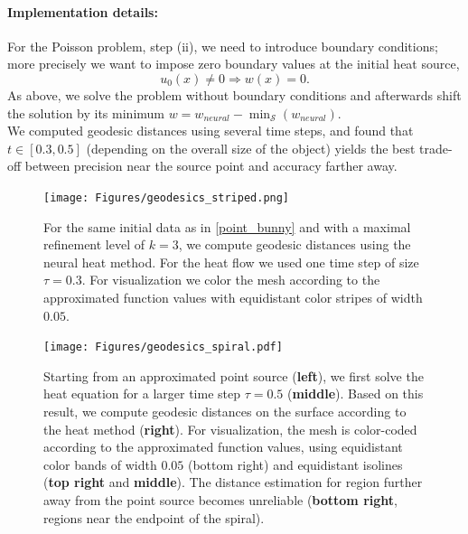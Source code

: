 \documentclass[12pt,openany]{book}
\def\S{\mathcal{S}}
\theoremstyle{plainnormal}
\theoremstyle{remark}
\begin{document}
\paragraph{Implementation details:}
For the Poisson problem, step (ii), we need to introduce boundary conditions; more precisely we want to impose zero boundary values at the initial heat source, $$u_0(x) \neq 0 \Rightarrow w(x) = 0.$$
As above, we solve the problem without boundary conditions and afterwards shift the solution by its minimum $w = w_{neural} - \min_\S(w_{neural}).$\\
We computed geodesic distances using several time steps, and found that \( t \in [0.3, 0.5] \) (depending on the overall size of the object) yields the best trade-off between precision near the source point and accuracy farther away.
\begin{figure}[b]
  \centering
  \begin{minipage}{0.54\linewidth}
    \texttt{[image: Figures/geodesics\_striped.png]}
  \end{minipage}%
  \hspace{0.02\linewidth}
  \begin{minipage}{0.45\linewidth}
    \caption{
      For the same initial data as in \cref{point_bunny} and with a maximal refinement level of $k=3$, we compute geodesic distances using the neural heat method. For the heat flow we used one time step of size $\tau = 0.3$. For visualization we color the mesh according to the approximated function values with equidistant color stripes of width $0.05$.}
    \label{fig:geodINHeat2}
  \end{minipage}
\end{figure}

\begin{figure}
    \texttt{[image: Figures/geodesics\_spiral.pdf]}
\caption{Starting from an approximated point source (\textbf{left}), we first solve the heat equation for a larger time step $\tau = 0.5$ (\textbf{middle}). Based on this result, we compute geodesic distances on the surface according to the heat method (\textbf{right}). For visualization, the mesh is color-coded according to the approximated function values, using equidistant color bands of width $0.05$ (bottom right) and equidistant isolines (\textbf{top right} and \textbf{middle}). The distance estimation for region further away from the point source becomes unreliable (\textbf{bottom right}, regions near the endpoint of the spiral).}\label{}
\end{figure}
\end{document}
